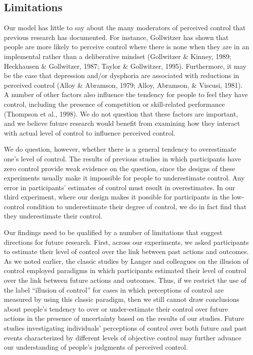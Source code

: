 \documentclass[USenglish,letterpaper,12pt,extrafontsizes,oneside,onecolumn,final]{memoir}
\begin{document}
\subsection{Limitations}
Our model has little to say about the many moderators of perceived control that previous research has documented. For instance, Gollwitzer has shown that people are more likely to perceive control where there is none when they are in an implemental rather than a deliberative mindset (Gollwitzer \& Kinney, 1989; Heckhausen \& Gollwitzer, 1987; Taylor \& Gollwitzer, 1995).  Furthermore, it may be the case that depression and/or dysphoria are associated with reductions in perceived control (Alloy \& Abramson, 1979; Alloy, Abramson, \& Viscusi, 1981). A number of other factors also influence the tendency for people to feel they have control, including the presence of competition or skill-related performance (Thompson et al., 1998). We do not question that these factors are important, and we believe future research would benefit from examining how they interact with actual level of control to influence perceived control.

We do question, however, whether there is a general tendency to overestimate one's level of control. The results of previous studies in which participants have zero control provide weak evidence on the question, since the designs of these experiments usually make it impossible for people to underestimate control. Any error in participants' estimates of control must result in overestimates. In our third experiment, where our design makes it possible for participants in the low-control condition to underestimate their degree of control, we do in fact find that they underestimate their control. 

Our findings need to be qualified by a number of limitations that suggest directions for future research. First, across our experiments, we asked participants to estimate their level of control over the link between past actions and outcomes. As we noted earlier, the classic studies by Langer and colleagues on the illusion of control employed paradigms in which participants estimated their level of control over the link between future actions and outcomes. Thus, if we restrict the use of the label ``illusion of control'' for cases in which perceptions of control are measured by using this classic paradigm, then we still cannot draw conclusions about people's tendency to over or under-estimate their control over future actions in the presence of uncertainty based on the results of our studies. Future studies investigating individuals' perceptions of control over both future and past events characterized by different levels of objective control may further advance our understanding of people's judgments of perceived control. 
\end{document}
